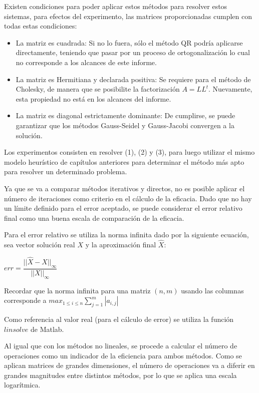 \documentclass{memoria}
\begin{document}
Existen condiciones para poder aplicar estos métodos para resolver estos sistemas, para efectos del experimento, las matrices proporcionadas cumplen con todas estas condiciones:

\begin{itemize}
    \item La matriz es cuadrada: Si no lo fuera, sólo el método QR podría aplicarse directamente, teniendo que pasar por un proceso de ortogonalización lo cual no corresponde a los alcances de este informe.
    \item La matriz es Hermitiana y declarada positiva: Se requiere para el método de Cholesky, de manera que se posibilite la factorización $A = LL^t$. Nuevamente, esta propiedad no está en los alcances del informe.
    \item La matriz es diagonal estrictamente dominante: De cumplirse, se puede garantizar que los métodos Gauss-Seidel y Gauss-Jacobi convergen a la solución.
\end{itemize}

Los experimentos consisten en resolver (1), (2) y (3), para luego utilizar el mismo modelo heurístico de capítulos anteriores para determinar el método más apto para resolver un determinado problema.


Ya que se va a comparar métodos iterativos y directos, no es posible aplicar el número de iteraciones como criterio en el cálculo de la eficacia. Dado que no hay un límite definido para el error aceptado, se puede considerar el error relativo final como una buena escala de comparación de la eficacia.

Para el error relativo se utiliza la norma infinita dado por la siguiente ecuación, sea vector solución real $X$ y la aproximación final $\hat{X}$:\\
\begin{center}
$err = \dfrac{||\hat{X} - X||_{\infty}}{||X||_{\infty}}$
\end{center}

Recordar que la norma infinita para una matriz $(n,m)$ usando las columnas corresponde a $max_{1 \leq i \leq n}\sum_{j=1}^{m}|a_{i,j}|$

Como referencia al valor real (para el cálculo de error) se utiliza la función $linsolve$ de Matlab.


Al igual que con los métodos no lineales, se procede a calcular el número de operaciones como un indicador de la eficiencia para ambos métodos. Como se aplican matrices de grandes dimensiones, el número de operaciones va a diferir en grandes magnitudes entre distintos métodos, por lo que se aplica una escala logarítmica.
\end{document}
